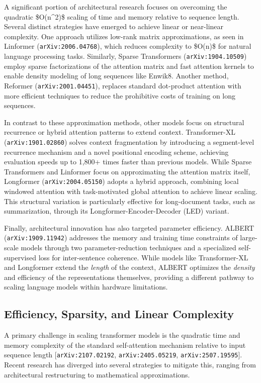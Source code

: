 \documentclass[11pt]{article}
\begin{document}
A significant portion of architectural research focuses on overcoming the quadratic \$O(n\textasciicircum{}2)\$ scaling of time and memory relative to sequence length. Several distinct strategies have emerged to achieve linear or near-linear complexity. One approach utilizes low-rank matrix approximations, as seen in Linformer (\texttt{arXiv:2006.04768}), which reduces complexity to \$O(n)\$ for natural language processing tasks. Similarly, Sparse Transformers (\texttt{arXiv:1904.10509}) employ sparse factorizations of the attention matrix and fast attention kernels to enable density modeling of long sequences like Enwik8. Another method, Reformer (\texttt{arXiv:2001.04451}), replaces standard dot-product attention with more efficient techniques to reduce the prohibitive costs of training on long sequences.

In contrast to these approximation methods, other models focus on structural recurrence or hybrid attention patterns to extend context. Transformer-XL (\texttt{arXiv:1901.02860}) solves context fragmentation by introducing a segment-level recurrence mechanism and a novel positional encoding scheme, achieving evaluation speeds up to 1,800+ times faster than previous models. While Sparse Transformers and Linformer focus on approximating the attention matrix itself, Longformer (\texttt{arXiv:2004.05150}) adopts a hybrid approach, combining local windowed attention with task-motivated global attention to achieve linear scaling. This structural variation is particularly effective for long-document tasks, such as summarization, through its Longformer-Encoder-Decoder (LED) variant.

Finally, architectural innovation has also targeted parameter efficiency. ALBERT (\texttt{arXiv:1909.11942}) addresses the memory and training time constraints of large-scale models through two parameter-reduction techniques and a specialized self-supervised loss for inter-sentence coherence. While models like Transformer-XL and Longformer extend the \textit{length} of the context, ALBERT optimizes the \textit{density} and efficiency of the representations themselves, providing a different pathway to scaling language models within hardware limitations.

\subsection{Efficiency, Sparsity, and Linear Complexity}

A primary challenge in scaling transformer models is the quadratic time and memory complexity of the standard self-attention mechanism relative to input sequence length [\texttt{arXiv:2107.02192}, \texttt{arXiv:2405.05219}, \texttt{arXiv:2507.19595}]. Recent research has diverged into several strategies to mitigate this, ranging from architectural restructuring to mathematical approximations.
\end{document}
